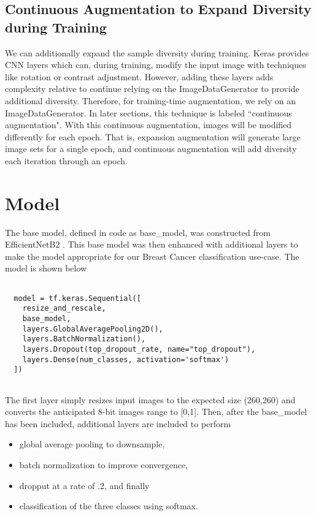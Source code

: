 \documentclass[sn-mathphys,Numbered]{sn-jnl}%
\theoremstyle{thmstyleone}%
\theoremstyle{thmstyletwo}%
\theoremstyle{thmstylethree}%
\begin{document}
\subsection{Continuous Augmentation to Expand Diversity during Training}
We can additionally expand the sample diversity during training.  Keras provides CNN layers which can, during training, modify the input image with techniques like rotation or contrast adjustment.  However, adding these layers adds complexity relative to continue relying on the ImageDataGenerator to provide additional diversity.  Therefore, for training-time augmentation, we rely on an ImageDataGenerator. In later sections, this technique is labeled ``continuous augmentation".  With this continuous augmentation, images will be modified differently for each epoch.  That is, expansion augmentation will generate large image sets for a single epoch, and continuous augmentation will add diversity each iteration through an epoch.  

\section{Model}\label{sec_model}
The base model, defined in code as base\_model, was constructed from EfficientNetB2 \cite{effnet}.  This base model was then enhanced with additional layers to make the model appropriate for our Breast Cancer classification use-case.  The model is shown below
\begin{lstlisting}

  model = tf.keras.Sequential([
    resize_and_rescale,
    base_model,
    layers.GlobalAveragePooling2D(),
    layers.BatchNormalization(),
    layers.Dropout(top_dropout_rate, name="top_dropout"),
    layers.Dense(num_classes, activation='softmax')
  ])


\end{lstlisting}

The first layer simply resizes input images to the expected size (260,260) and converts the anticipated 8-bit images range to [0,1].  Then, after the base\_model has been included, additional layers are included to perform 
\begin{itemize}
\item global average pooling to downsample,
\item batch normalization to improve convergence,
\item dropput at a rate of .2, and finally
\item classification of the three classes using softmax.
\end{itemize}
\end{document}
